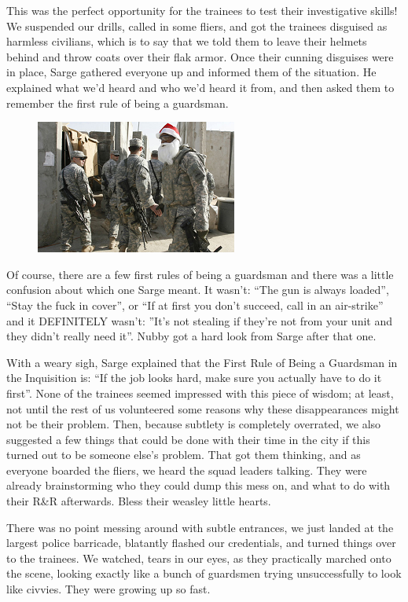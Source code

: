 This was the perfect opportunity for the trainees to test their investigative skills! 
We suspended our drills, called in some fliers, and got the trainees disguised as harmless civilians, which is to say that we told them to leave their helmets behind and throw coats over their flak armor. 
Once their cunning disguises were in place, Sarge gathered everyone up and informed them of the situation. 
He explained what we’d heard and who we’d heard it from, and then asked them to remember the first rule of being a guardsman.

\begin{figure}
	\begin{center}
		\includegraphics[width=\figwidth]{pics/8/27.png}
	\end{center}
\end{figure}
Of course, there are a few first rules of being a guardsman and there was a little confusion about which one Sarge meant. 
It wasn’t: 
“The gun is always loaded”, “Stay the fuck in cover”, or “If at first you don't succeed, call in an air-strike” and it DEFINITELY wasn’t: 
”It’s not stealing if they’re not from your unit and they didn’t really need it”. 
Nubby got a hard look from Sarge after that one.

With a weary sigh, Sarge explained that the First Rule of Being a Guardsman in the Inquisition is: 
“If the job looks hard, make sure you actually have to do it first”. 
None of the trainees seemed impressed with this piece of wisdom; 
at least, not until the rest of us volunteered some reasons why these disappearances might not be their problem. 
Then, because subtlety is completely overrated, we also suggested a few things that could be done with their time in the city if this turned out to be someone else’s problem. 
That got them thinking, and as everyone boarded the fliers, we heard the squad leaders talking. 
They were already brainstorming who they could dump this mess on, and what to do with their R\&R afterwards. 
Bless their weasley little hearts.

There was no point messing around with subtle entrances, we just landed at the largest police barricade, blatantly flashed our credentials, and turned things over to the trainees. 
We watched, tears in our eyes, as they practically marched onto the scene, looking exactly like a bunch of guardsmen trying unsuccessfully to look like civvies. 
They were growing up so fast.

